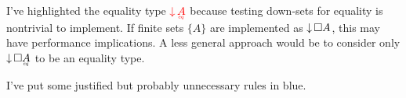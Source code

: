 \documentclass{article}
\begin{document}
I've highlighted the equality type ${\color{red} \Down{\eq{A}}}$ because testing
down-sets for equality is nontrivial to implement. If finite sets $\{A\}$ are
implemented as ${\downarrow}\,{\square{A}}$, this may have performance implications. A less
general approach would be to consider only $\Down{\Disc{\eq{A}}}$ to be an
equality type.

I've put some justified but probably unnecessary rules in {\color{Cerulean} blue}.














\end{document}
